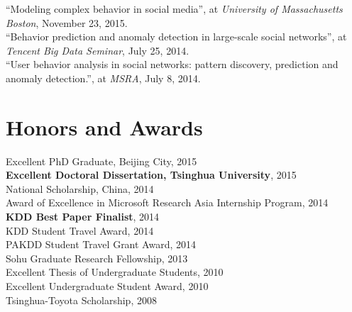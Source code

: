 \documentclass[margin, 10pt]{res} %
\begin{document}
\begin{resume}
``Modeling complex behavior in social media'', at {\em University of Massachusetts Boston}, November 23, 2015. \\
``Behavior prediction and anomaly detection in large-scale social networks'', at {\em Tencent Big Data Seminar}, July 25, 2014. \\
``User behavior analysis in social networks: pattern discovery, prediction and anomaly detection.'', at {\em MSRA}, July 8, 2014.


\section{Honors and Awards}

{Excellent PhD Graduate, Beijing City}, 2015 \\
{\bf Excellent Doctoral Dissertation, Tsinghua University}, 2015 \\
{National Scholarship, China}, 2014 \\
{Award of Excellence in Microsoft Research Asia Internship Program}, 2014 \\
{\bf KDD Best Paper Finalist}, 2014 \\
{KDD Student Travel Award}, 2014 \\
{PAKDD Student Travel Grant Award}, 2014 \\
{Sohu Graduate Research Fellowship}, 2013 \\
{Excellent Thesis of Undergraduate Students}, 2010 \\
{Excellent Undergraduate Student Award}, 2010 \\
{Tsinghua-Toyota Scholarship}, 2008




\end{resume}
\end{document}
